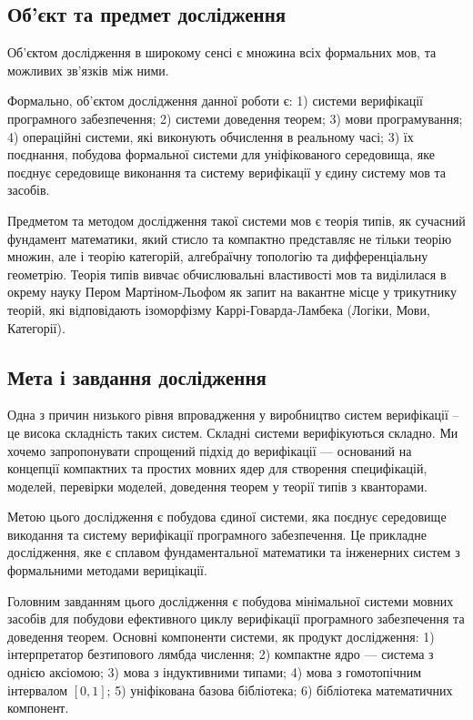 \subsection*{Об'єкт та предмет дослідження}
Об'єктом дослідження в широкому сенсі є множина
всіх формальних мов, та можливих зв'язків між ними.

Формально, об'єктом дослідження данної роботи є:
1) системи верифікації програмного забезпечення;
2) системи доведення теорем;
3) мови програмування;
4) операційні системи, які виконують обчислення в реальному часі;
3) їх поєднання, побудова формальної системи для
уніфікованого середовища, яке поєднує середовище
виконання та систему верифікації у єдину систему мов та засобів.

Предметом та методом дослідження такої системи мов є теорія типів,
як сучасний фундамент математики,
який стисло та компактно представляє не тільки теорію множин,
але і теорію категорій, алгебраїчну топологію та дифференціальну геометрію.
Теорія типів вивчає обчислювальні властивості мов та виділилася
в окрему науку Пером Мартіном-Льофом як запит на вакантне місце у
трикутнику теорій, які відповідають ізоморфізму
Каррі-Говарда-Ламбека (Логіки, Мови, Категорії).

\subsection*{Мета і завдання дослідження}
Одна з причин низького рівня впровадження у виробництво систем
верифікації -- це висока складність таких систем. Складні системи
верифікуються складно. Ми хочемо запропонувати спрощений
підхід до верифікації --- оснований на концепції компактних
та простих мовних ядер для створення специфікацій, моделей,
перевірки моделей, доведення теорем у теорії типів з кванторами.

Метою цього дослідження є побудова єдиної системи, яка поєднує середовище
викодання та систему верифікації програмного забезпечення. Це прикладне дослідження,
яке є сплавом фундаментальної математики та інженерних
систем з формальними методами верицікації.

Головним завданням цього дослідження є побудова мінімальної системи
мовних засобів для побудови ефективного циклу верифікації програмного
забезпечення та доведення теорем. Основні компоненти системи, як продукт дослідження:
1) інтерпретатор безтипового лямбда числення;
2) компактне ядро --- система з однією аксіомою;
3) мова з індуктивними типами;
4) мова з гомотопічним інтервалом $[0,1]$;
5) уніфікована базова бібліотека;
6) бібліотека математичних компонент.


